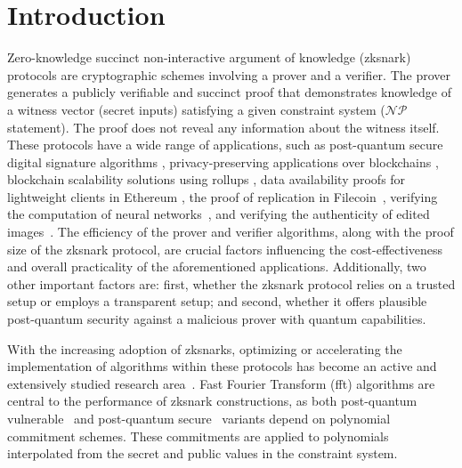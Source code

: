 \chapter{Introduction} \label{ch:Intro}
Zero-knowledge succinct non-interactive argument of knowledge (\gls{zksnark}) protocols are cryptographic schemes involving a prover and a verifier. The prover generates a publicly verifiable and succinct proof that demonstrates knowledge of a witness vector (secret inputs) satisfying a given constraint system ($\mathcal{NP}$ statement). The proof does not reveal any information about the witness itself. These protocols have a wide range of applications, such as post-quantum secure digital signature algorithms \cite{faest2023,picnic2017,Preon2023,picnic2018}, privacy-preserving applications over blockchains \cite{zcash-proc,Hawk,ZeeStar,ZEXE,williamson2018aztec}, blockchain scalability solutions using rollups \cite{Arun2024Jolt,Chaliasos2024,Thibault2022,PolygonZKEVM,zkSync,STARKnet}, data availability proofs for lightweight clients in Ethereum \cite{HallAndersen2024FRIDA}, the proof of replication in Filecoin~\cite{benet2017proof}, verifying the computation of neural networks~\cite{Haochen2024zkLLM,Chen2024ZKML,Weng2021Mystique}, and verifying the authenticity of edited images~\cite{Dziembowski2025VIMz}. 
The efficiency of the prover and verifier algorithms, along with the proof size of the  \gls{zksnark} protocol, are crucial factors influencing the cost-effectiveness and overall practicality of the aforementioned applications. Additionally, two other important factors are: first, whether the \gls{zksnark} protocol relies on a trusted setup or employs a transparent setup; and second, whether it offers plausible post-quantum security against a malicious prover with quantum capabilities.

With the increasing adoption of \glspl{zksnark}, optimizing or accelerating the implementation of algorithms within these protocols has become an active and extensively studied research area~\cite{ECFFT1_2023,ECFFT_2022,Diamond2023Towers,CHES:LuoFuGong23,Ji2024GPU,Jandhyala2024AirFRI}. Fast Fourier Transform (\gls{fft}) algorithms are central to the performance of \gls{zksnark} constructions, as both post-quantum vulnerable~\cite{Groth2016,Marlin2020,Bulletproofs2018,Gabizon2019PLONK,halo2-book} and post-quantum secure~\cite{Ames2017Ligero,Ben-Sasson2018STARK,Aurora2019,Chiesa2020Fractal,Polaris} variants depend on polynomial commitment schemes. These commitments are applied to polynomials interpolated from the secret and public values in the constraint system.

